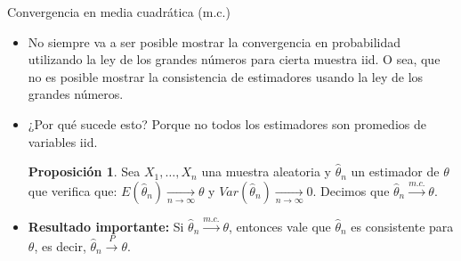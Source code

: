 \documentclass{beamer}
\theoremstyle{definition}
\newcommand{\cmc}{\overset{m.c.}{\rightarrow}}
\newtheorem{proposition}{Proposici\'on}
\newcommand{\ton}{\underset{n\to\infty}{\longrightarrow}}
\newcommand{\cp}{\overset{P}{\rightarrow}}
\begin{document}
\begin{frame}{\color{rosee}Convergencia en media cuadrática (m.c.)}\small
  \begin{itemize}
 \item  No siempre va a ser posible mostrar la convergencia en probabilidad utilizando la ley de los grandes números para cierta muestra iid. O sea, que no es posible mostrar la consistencia de estimadores usando la ley de los grandes números. 
 
 \item ¿Por qué sucede esto? Porque no todos los estimadores son promedios de variables iid.
 

  
  
  \medskip
  \begin{proposition}
    Sea $X_{1},\dots, X_n$ una muestra aleatoria y $\widehat{\theta}_n$ un estimador de $\theta$ que verifica que: $E(\widehat{\theta}_n) \ton \theta$ y $Var(\widehat{\theta}_n) \ton 0$. Decimos que $\widehat{\theta}_n\cmc \theta$. 
    
 \end{proposition}
    \bigskip
    
    \item \textbf{Resultado importante:} Si $\widehat{\theta}_n\cmc \theta$, entonces vale que $\widehat{\theta}_n$ es consistente para $\theta$, es decir, $\widehat{\theta}_n\cp \theta$.
  
  \end{itemize}
\end{frame}
\end{document}
